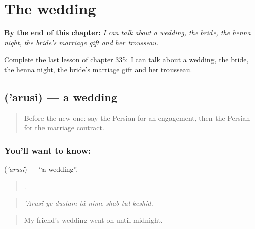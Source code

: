 
\chapter{The wedding}
\label{ch:fa-the-wedding}

\begin{chapteropening}
\textbf{By the end of this chapter:} \emph{I can talk about a wedding, the bride, the henna night, the bride's marriage gift and her trousseau.}

Complete the last lesson of chapter 335: I can talk about a wedding, the bride, the henna night, the bride's marriage gift and her trousseau.
\end{chapteropening}

\section[\texorpdfstring{\fa{عروسی} ('arusi)}{عروسی ('arusi)}]{ ('arusi) — a wedding}

\label{lesson:FA-C335-arusi}



\begin{quote}
Before the new one: say the Persian for an engagement, then the Persian for the marriage contract.
\end{quote}

\subsection*{You'll want to know: }
\textbf{} (\emph{'arusi}) — \textquotedblleft{}a wedding\textquotedblright{}.

\begin{quote}
      .
\end{quote}

\begin{quote}
\emph{'Arusi-ye dustam tâ nime shab tul keshid.}
\end{quote}

\begin{quote}
My friend's wedding went on until midnight.
\end{quote}

